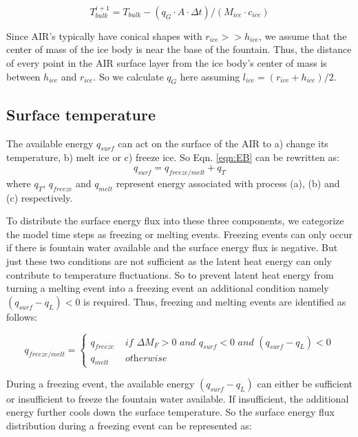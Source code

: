 \documentclass[utf8]{frontiersSCNS} %
\begin{document}
\begin{equation} T_{bulk}^{i+1} = T_{bulk} - (q_{G} \cdot A \cdot \Delta t)/(M_{ice} \cdot c_{ice}) \end{equation}

Since AIR's typically have conical shapes with $r_{ice} >> h_{ice}$, we assume that the center of mass of the ice body
is near the base of the fountain. Thus, the distance of every point in the AIR surface layer from the ice body's center
of mass is between $h_{ice}$ and $r_{ice}$. So we calculate $q_{G}$ here assuming $l_{ice} = (r_{ice} + h_{ice})/2$. 

\subsection{Surface temperature}
The available energy $q_{surf}$ can act on the surface of the AIR to a) change its temperature, b) melt ice or
c) freeze ice. So Eqn. \ref{eqn:EB} can be rewritten as: \begin{equation} q_{surf} = q_{freeze/melt} +
q_{T} \end{equation}
where $q_{T}$, $q_{freeze}$ and $q_{melt}$ represent energy associated with process (a), (b) and (c) respectively.

To distribute the surface energy flux into these three components, we categorize the model time steps as freezing or
melting events. Freezing events can only occur if there is fountain water available and the surface energy flux is
negative. But just these two conditions are not sufficient as the latent heat energy can only contribute to temperature
fluctuations. So to prevent latent heat energy from turning a melting event into a freezing event an additional
condition namely $(q_{surf}-q_{L}) < 0$ is required. Thus, freezing and melting events are identified as follows:

\begin{equation} 
    q_{freeze/melt} = \left\{ \begin{array}{ll}
            q_{freeze} & \textit{ if } \Delta M_{F} > 0 \textit{ and } q_{surf} < 0 \textit{ and }(q_{surf}-q_{L}) < 0 \\
            q_{melt} & \textit{ otherwise} 
    \end{array} \right. 
\end{equation} 

During a freezing event, the available energy $(q_{surf}-q_{L})$ can either be sufficient or insufficient to freeze the
fountain water available. If insufficient, the additional energy further cools down the surface temperature. So the
surface energy flux distribution during a freezing event can be represented as:
\end{document}
